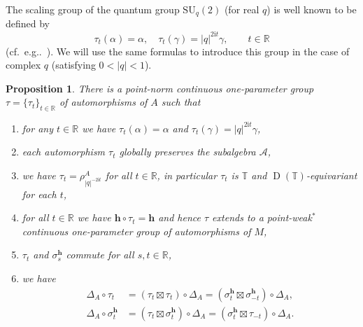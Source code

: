 \documentclass[12pt,reqno,a4paper]{amsart}
\newtheorem{proposition}{Proposition}[section]
\theoremstyle{definition}
\newcommand{\comp}{\circ}
\newcommand{\ii}{\mathrm{i}}
\newcommand{\RR}{\mathbb{R}}
\newcommand{\TT}{\mathbb{T}}
\newcommand{\cA}{\mathscr{A}}
\newcommand{\bh}{{\boldsymbol{h}}}
\DeclareMathOperator{\D}{D}
\newcommand{\SU}{\mathrm{SU}}
\numberwithin{equation}{section}
\begin{document}
The scaling group of the quantum group $\SU_q(2)$ (for real $q$) is well known to be defined by
\begin{equation}\label{eq-eq62}
\tau_t(\alpha)=\alpha,\quad\tau_t(\gamma)=|q|^{2\ii t}\gamma,\qquad t\in\RR
\end{equation}
(cf.~e.g..~\cite[Example 1.7.8]{NeshveyevTuset}). We will use the same formulas to introduce this group in the case of complex $q$ (satisfying $0<|q|<1$).

\begin{proposition}\label{prop-tau}
There is a point-norm continuous one-parameter group $\tau=\{\tau_t\}_{t\in\RR}$ of automorphisms of $A$ such that
\begin{enumerate}
\item for any $t\in\RR$ we have $\tau_t(\alpha)=\alpha$ and $\tau_t(\gamma)=|q|^{2\ii t}\gamma$,
\item each automorphism $\tau_t$ globally preserves the subalgebra $\cA$,
\item we have $\tau_t=\rho^A_{|q|^{-2\ii t}}$ for all $t\in\RR$, in particular $\tau_t$ is $\TT$ and $\D(\TT)$-equivariant for each $t$,
\item for all $t\in\RR$ we have $\bh\comp\tau_t=\bh$ and hence $\tau$ extends to a point-weak${}^*$ continuous one-parameter group of automorphisms of $M$,
\item $\tau_t$ and $\sigma^\bh_s$ commute for all $s,t\in\RR$,
\item\label{prop-tau1} we have
\begin{subequations}
\begin{align}
\Delta_A\comp\tau_t&=(\tau_t\boxtimes\tau_t)\comp\Delta_A
=(\sigma^\bh_t\boxtimes\sigma^\bh_{-t})\comp\Delta_A,\label{eq-prop-tau1}\\
\Delta_A\comp\sigma^\bh_t&=(\tau_t\boxtimes\sigma^\bh_t)\comp\Delta_A
=(\sigma^\bh_{t}\boxtimes\tau_{-t})\comp\Delta_A.\label{eq-prop-tau2}
\end{align}
\end{subequations}
\end{enumerate}
\end{proposition}
\end{document}
